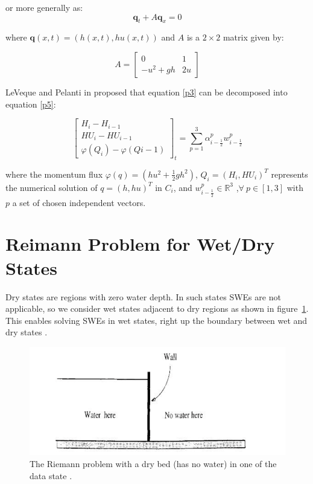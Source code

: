\documentclass[12pt,a4paper]{article}
\begin{document}
	\noindent or more generally as:
	\begin{equation}
		\mathbf q_t + A \mathbf q_x = 0
	\end{equation}
	
	\noindent where $\mathbf q(x,t) = (h(x,t), hu(x,t))$ and $A$ is a $2 \times 2$ matrix given by:
	
	\begin{equation}
		A = \begin{bmatrix} 0 &  1 \\ -u^{2} + gh & 2u \end{bmatrix}
	\end{equation}
	
	\noindent LeVeque and Pelanti in \cite{leveque2001class} proposed that equation \eqref{p3} can be decomposed into equation \eqref{p5}:
	
	\begin{equation}
				\begin{bmatrix} 
					H_{i} - H_{i-1}\\ 	HU_{i} - HU_{i-1} \\  \varphi(Q_{i}) - \varphi(Q{i-1}) 
				\end{bmatrix}_t = \sum_{p=1}^{3} \alpha_{i-\frac{1}{2}}^{p} w_{i-\frac{1}{2}}^{p}
			\label{p5}
	\end{equation}

	\noindent where the momentum flux $\varphi(q) = (hu^{2} + \frac{1}{2} gh^{2})$, $Q_{i} = (H_{i},HU_{i})^{T}$ represents the numerical solution of $q = (h,hu)^{T}$ in $C_{i}$, and $w_{i-\frac{1}{2}}^{p} \in \mathbb{R}^{3}$ ,$\forall ~ p \in [1,3] $ with $p$ a set of chosen independent vectors.



	\section{Reimann Problem for Wet/Dry States}
	
	Dry states are regions with zero water depth. In such states SWEs are not applicable, so we consider wet states adjacent to dry regions as shown in figure~\ref{fig:dry-bed}. This enables solving SWEs in wet states, right up the boundary between wet and dry states \citep{toro2001shock}.
	\begin{figure}[H]
		\centering
		\includegraphics[width=0.7\linewidth]{images/dry-bed}
		\caption{ The Riemann problem with a dry bed (has no water) in one of the data state \cite{toro2001shock}.}
		\label{fig:dry-bed}
	\end{figure}
	
\end{document}
